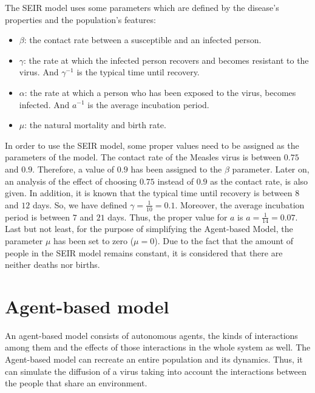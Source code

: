 \documentclass[a4paper]{article}
\begin{document}
The SEIR model uses some parameters which are defined by the disease's properties and the population's features:
\begin{itemize}
\item $\beta$: the contact rate between a susceptible and an infected person.
\item $\gamma$: the rate at which the infected person recovers and becomes resistant to the virus. And $\gamma^{-1}$ is the typical time until recovery.
\item $\alpha$: the rate at which a person who has been exposed to the virus, becomes infected. And $a^{-1}$ is the average incubation period.
\item $\mu$: the natural mortality and birth rate.
\end{itemize}

In order to use the SEIR model, some proper values need to be assigned as the parameters of the model. The contact rate of the Measles virus is between $0.75$ and $0.9$. Therefore, a value of $0.9$ has been assigned to the $\beta$ parameter. Later on, an analysis of the effect of choosing $0.75$ instead of $0.9$ as the contact rate, is also given. In addition, it is known that the typical time until recovery is between $8$ and $12$ days. So, we have defined $\gamma = \frac{1}{10} = 0.1$. Moreover, the average incubation period is between $7$ and $21$ days. Thus, the proper value for $a$ is $a= \frac{1}{14} = 0.07$. Last but not least, for the purpose of simplifying the Agent-based Model, the parameter $\mu$ has been set to zero ($\mu=0$). Due to the fact that the amount of people in the SEIR model remains constant, it is considered that there are neither deaths nor births. 
 
\section{Agent-based model}
An agent-based model consists of autonomous agents, the kinds of interactions among them and the effects of those interactions in the whole system as well. The Agent-based model can recreate an entire population and its dynamics. Thus, it can simulate the diffusion of a virus taking into account the interactions between the people that share an environment. 
\end{document}
